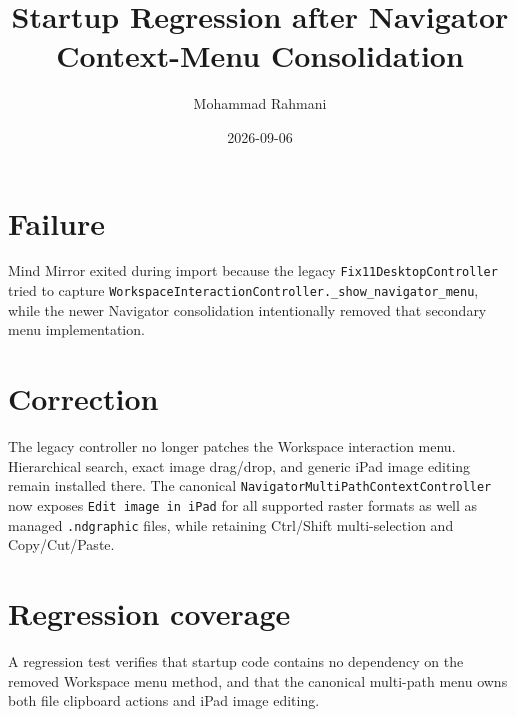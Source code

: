 \documentclass[a4paper]{article}
\title{Startup Regression after Navigator Context-Menu Consolidation}
\date{2026-09-06}
\author{Mohammad Rahmani}
\begin{document}
   \maketitle

   \section{Failure}
   Mind Mirror exited during import because the legacy
   \texttt{Fix11DesktopController} tried to capture
   \texttt{WorkspaceInteractionController.\_show\_navigator\_menu}, while the
   newer Navigator consolidation intentionally removed that secondary menu
   implementation.

   \section{Correction}
   The legacy controller no longer patches the Workspace interaction menu.
   Hierarchical search, exact image drag/drop, and generic iPad image editing
   remain installed there.  The canonical
   \texttt{NavigatorMultiPathContextController} now exposes
   \texttt{Edit image in iPad} for all supported raster formats as well as
   managed \texttt{.ndgraphic} files, while retaining Ctrl/Shift
   multi-selection and Copy/Cut/Paste.

   \section{Regression coverage}
   A regression test verifies that startup code contains no dependency on the
   removed Workspace menu method, and that the canonical multi-path menu owns
   both file clipboard actions and iPad image editing.

   
   
\end{document}
